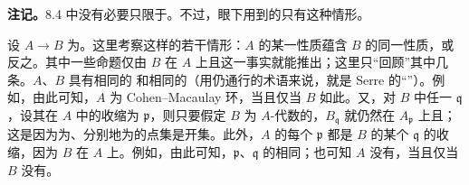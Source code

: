 \textbf{注记。}8.4 中没有必要只限于。不过，眼下用到的只有这种情形。

设 $A\to B$ 为。这里考察这样的若干情形：$A$ 的某一性质蕴含 $B$ 的同一性质，或反之。其中一些命题仅由 $B$ 在 $A$ 上且这一事实就能推出；这里只“回顾”其中几条。$A$、$B$ 具有相同的 和相同的（用仍通行的术语来说，就是 Serre 的“”）。例如，由此可知，$A$ 为 Cohen--Macaulay 环，当且仅当 $B$ 如此。又，对 $B$ 中任一 $\mathfrak q$，设其在 $A$ 中的收缩为 $\mathfrak p$，则只要假定 $B$ 为 $A$-代数的，$B_{\mathfrak q}$ 就仍然在 $A_{\mathfrak p}$ 上且；这是因为为、分别地为的点集是开集。此外，$A$ 的每个 $\mathfrak p$ 都是 $B$ 的某个 $\mathfrak q$ 的收缩，因为 $B$ 在 $A$ 上。例如，由此可知，$\mathfrak p$、$\mathfrak q$ 的相同；也可知 $A$ 没有，当且仅当 $B$ 没有。

